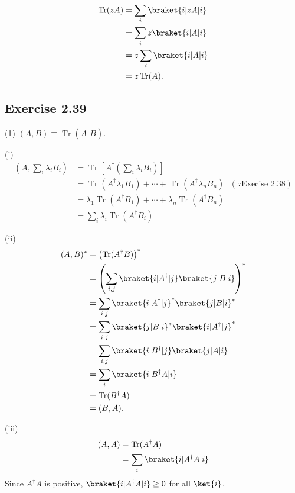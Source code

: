 \documentclass[a4paper,12pt]{article}
\DeclareMathOperator{\Tr}{Tr}
\begin{document}
\begin{align*}
	\Tr (z A) &=  \sum_i \braket{i | z A | i}\\
		&= \sum_i z \braket{i | A | i}\\
		&= z \sum_i \braket{i | A | i}\\
		&= z \Tr (A).
\end{align*}




\subsection*{Exercise 2.39}
(1) $(A, B) \equiv \Tr (A^\dagger B)$.

\vspace{5mm}
(i)
\begin{align*}
	\left(A, \sum_i \lambda_i B_i \right) &= \Tr \left[ A^\dagger \left(\sum_i \lambda_i B_i  \right) \right]\\
		&= \Tr (A^\dagger \lambda_1 B_1) + \cdots +  \Tr (A^\dagger \lambda_n B_n) ~~~ (\because \text{Execise 2.38}) \\
		&= \lambda_1 \Tr (A^\dagger B_1)  + \cdots  + \lambda_n \Tr (A^\dagger B_n) \\
		&= \sum_i \lambda_i \Tr (A^\dagger B_i)
\end{align*}


(ii)
\begin{align*}
	(A, B)^* &= \left( \Tr (A^\dagger B) \right)^*\\
		&= \left(\sum_{i,j} \braket{ i | A^\dagger | j} \braket{j | B | i}  \right)^*\\
		&= \sum_{i,j} \braket{ i | A^\dagger | j}^* \braket{j | B | i}^*\\
		&= \sum_{i,j}  \braket{j | B | i}^* \braket{ i | A^\dagger | j}^*\\
		&=  \sum_{i,j}  \braket{i | B^\dagger | j} \braket{ j | A | i}\\
		&= \sum_i \braket{i | B^\dagger A | i} \\
		&= \Tr (B^\dagger A)\\
		&= (B, A).
\end{align*}


(iii)
\begin{align*}
	(A, A) &= \Tr (A^\dagger A)\\
		&= \sum_i \braket{ i | A^\dagger A | i }
\end{align*}
Since $A^\dagger A$ is positive, $\braket{ i | A^\dagger A | i } \geq 0$ for all $\ket{ i }$.
\end{document}
